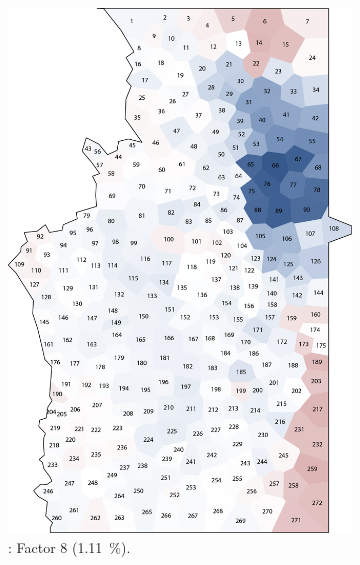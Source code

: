 \documentclass[output=paper]{LSP/langsci}
\begin{document}
\begin{figure}
\centering
\begin{subfigure}[t]{0.3\textwidth}
\includegraphics[width=\textwidth]{illustrations/pickl_fig12}
\caption{: Factor 8 (1.11~\%).}
\label{fig:12}
\end{subfigure}   
~
\begin{subfigure}[t]{0.3\textwidth}

\end{subfigure}
\end{figure}
\end{document}
